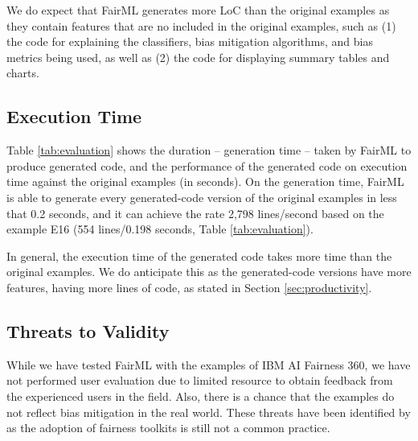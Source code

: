 \documentclass[sigconf,review]{acmart}
\begin{document}
We do expect that FairML generates more LoC than the original examples as they contain features that are no included in the original examples, such as (1) the code for explaining the classifiers, bias mitigation algorithms, and bias metrics being used, as well as (2) the code for displaying summary tables and charts. 




\subsection{Execution Time}
\label{sec:execution_time}

Table \ref{tab:evaluation} shows the duration -- generation time -- taken by FairML to produce generated code, 
and the performance of the generated code on execution time against the original examples (in seconds). 
On the generation time, 
FairML is able to generate every generated-code version of the original examples in less that 0.2 seconds, 
and it can achieve the rate 2,798 lines/second based on the example E16 
(554 lines/0.198 seconds, Table \ref{tab:evaluation}). 

In general, the execution time of the generated code takes more time than the original examples. 
We do anticipate this as the generated-code versions have more features, having more lines of code,
as stated in Section \ref{sec:productivity}. 

\subsection{Threats to Validity}
\label{sec:threats_to_validity}
While we have tested FairML with the examples of IBM AI Fairness 360, we have not performed user evaluation due to limited resource to obtain feedback from the experienced users in the field. Also, there is a chance that the examples do not reflect bias mitigation in the real world. These threats have been identified by \cite{lee2021landscape} as the adoption of fairness toolkits is still not a common practice.
\end{document}
